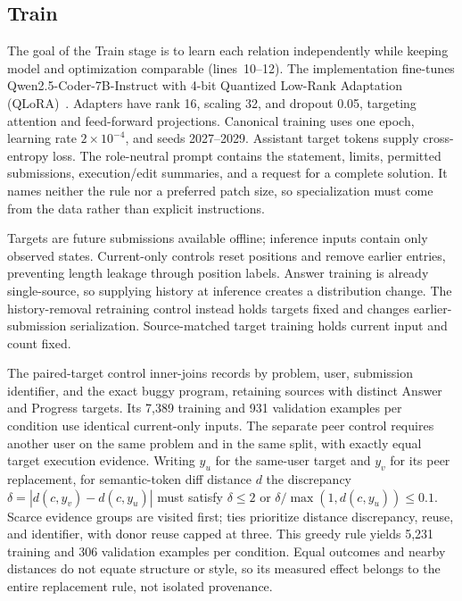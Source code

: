 \documentclass[10pt,conference]{IEEEtran}
\begin{document}
\subsection{Train}
\label{sec:train}
The goal of the Train stage is to learn each relation independently while keeping model and optimization comparable (lines~10--12). The implementation fine-tunes Qwen2.5-Coder-7B-Instruct with 4-bit Quantized Low-Rank Adaptation (QLoRA)~\cite{hui2024qwen2,dettmers2023qlora}. Adapters have rank 16, scaling 32, and dropout 0.05, targeting attention and feed-forward projections. Canonical training uses one epoch, learning rate \(2\times10^{-4}\), and seeds 2027--2029. Assistant target tokens supply cross-entropy loss. The role-neutral prompt contains the statement, limits, permitted submissions, execution/edit summaries, and a request for a complete solution. It names neither the rule nor a preferred patch size, so specialization must come from the data rather than explicit instructions.

Targets are future submissions available offline; inference inputs contain only observed states. Current-only controls reset positions and remove earlier entries, preventing length leakage through position labels. Answer training is already single-source, so supplying history at inference creates a distribution change. The history-removal retraining control instead holds targets fixed and changes earlier-submission serialization. Source-matched target training holds current input and count fixed.

The paired-target control inner-joins records by problem, user, submission identifier, and the exact buggy program, retaining sources with distinct Answer and Progress targets. Its 7,389 training and 931 validation examples per condition use identical current-only inputs. The separate peer control requires another user on the same problem and in the same split, with exactly equal target execution evidence. Writing \(y_u\) for the same-user target and \(y_v\) for its peer replacement, for semantic-token diff distance \(d\) the discrepancy \(\delta=|d(c,y_v)-d(c,y_u)|\) must satisfy \(\delta\le2\) or \(\delta/\max(1,d(c,y_u))\le0.1\). Scarce evidence groups are visited first; ties prioritize distance discrepancy, reuse, and identifier, with donor reuse capped at three. This greedy rule yields 5,231 training and 306 validation examples per condition. Equal outcomes and nearby distances do not equate structure or style, so its measured effect belongs to the entire replacement rule, not isolated provenance.
\end{document}
